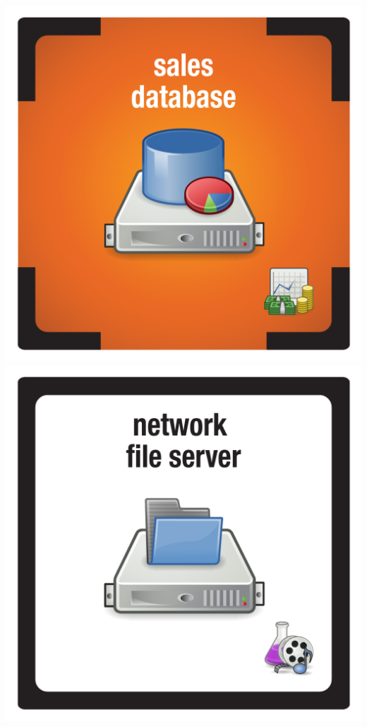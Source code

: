 \documentclass{letter}
\begin{document}
\includegraphics{tiles/node_sales_db_compromised}
\includegraphics{tiles/node_network_file_server} \\
\end{document}
